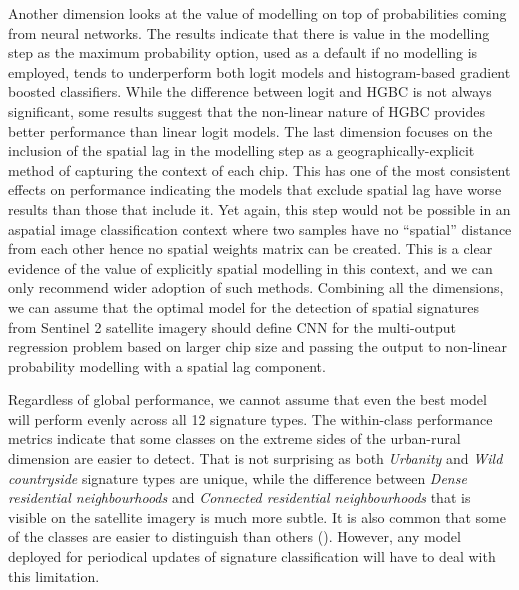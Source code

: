 Another dimension looks at the value of modelling on top of probabilities coming from
neural networks. The results indicate that there is value in the modelling step as the
maximum probability option, used as a default if no modelling is employed, tends to
underperform both logit models and histogram-based gradient
boosted classifiers. While the difference between logit and HGBC is not always
significant, some results suggest that the non-linear nature of HGBC provides better
performance than linear logit models.
The last dimension focuses on the inclusion of the spatial lag in the modelling step as a
geographically-explicit method of capturing the context of each chip. This has one of
the most consistent effects on performance indicating the models that exclude spatial lag have worse
results than those that include it. Yet again, this step would not be possible in an
aspatial image classification context where two samples have no ``spatial'' distance from each
other hence no spatial weights matrix can be created. This is a clear evidence of the value
of explicitly spatial modelling in this context, and we can only recommend wider adoption of such methods.
Combining all the dimensions, we can assume that the optimal model for the detection of spatial
signatures from Sentinel 2 satellite imagery should define CNN for the multi-output
regression problem based on larger chip size and passing the output to non-linear
probability modelling with a spatial lag component.

Regardless of global performance, we cannot assume that even the best model will perform evenly across all 12
signature types. The within-class performance metrics indicate that some classes on the
extreme sides of the urban-rural dimension are easier to detect. That is not surprising
as both \textit{Urbanity} and \textit{Wild countryside} signature types are unique,
while the difference between \textit{Dense residential neighbourhoods} and
\textit{Connected residential neighbourhoods} that is visible on the satellite imagery
is much more subtle. It is also common that some of the classes are easier to
distinguish than others (\cite{zanaga_daniele_2021_5571936, karra2021global}). However,
any model deployed for periodical updates of signature classification will have to deal
with this limitation.

